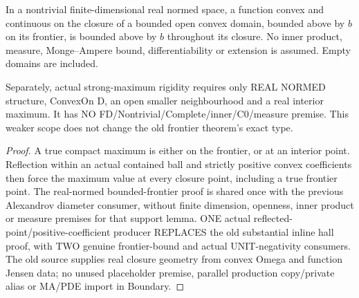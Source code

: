 \begin{lemma}
  \label{lem:convex-boundary-maximum}
  \leanok
  In a nontrivial finite-dimensional real normed space, a function convex and
  continuous on the closure of a bounded open convex domain, bounded above by
  $b$ on its frontier, is bounded above by $b$ throughout its closure.
  No inner product, measure, Monge--Ampere bound, differentiability or extension
  is assumed. Empty domains are included.

  Separately, actual strong-maximum rigidity requires only REAL NORMED
  structure, ConvexOn D, an open smaller neighbourhood and a real interior
  maximum. It has NO FD/Nontrivial/Complete/inner/C0/measure premise. This
  weaker scope does not change the old frontier theorem's exact type.
\end{lemma}
\begin{proof}
  \leanok
  A true compact maximum is either on the frontier, or at an interior point.
  Reflection within an actual contained ball and strictly positive convex
  coefficients then force the maximum value at every closure point, including
  a true frontier point. The real-normed bounded-frontier proof is shared once
  with the previous Alexandrov diameter consumer, without finite dimension,
  openness, inner product or measure premises for that support lemma.
  ONE actual reflected-point/positive-coefficient producer REPLACES the old
  substantial inline hall proof, with TWO genuine frontier-bound and actual
  UNIT-negativity consumers. The old source supplies real closure geometry
  from convex Omega and function Jensen data; no unused placeholder premise,
  parallel production copy/private alias or MA/PDE import in Boundary.
\end{proof}

